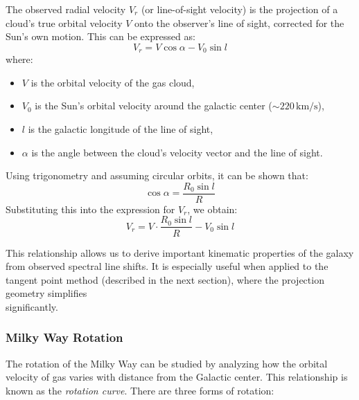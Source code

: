 \documentclass[12pt,a4paper]{article}
\begin{document}
The observed radial velocity $V_r$ (or line-of-sight velocity) is the projection of a cloud's true orbital velocity $V$ onto the observer's line of sight, corrected for the Sun's own motion. This can be expressed as:
\[
V_r = V \cos \alpha - V_0 \sin l
\]
where:
\begin{itemize}
  \item $V$ is the orbital velocity of the gas cloud,
  \item $V_0$ is the Sun's orbital velocity around the galactic center ($\sim220\,\mathrm{km/s}$),
  \item $l$ is the galactic longitude of the line of sight,
  \item $\alpha$ is the angle between the cloud's velocity vector and the line of sight.
\end{itemize}

Using trigonometry and assuming circular orbits, it can be shown that:
\[
\cos \alpha = \frac{R_0 \sin l}{R}
\]
Substituting this into the expression for $V_r$, we obtain:
\[
V_r = V \cdot \frac{R_0 \sin l}{R} - V_0 \sin l
\]

This relationship allows us to derive important kinematic properties of the galaxy from observed spectral line shifts. It is especially useful when applied to the tangent point method (described in the next section), where the projection geometry simplifies \\ significantly.

  
    \subsubsection*{Milky Way Rotation}

The rotation of the Milky Way can be studied by analyzing how the orbital velocity of gas varies with distance from the Galactic center. This relationship is known as the \emph{rotation curve}. There are three forms of rotation:
\end{document}

